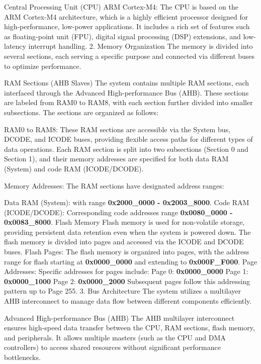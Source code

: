 \documentclass{Configuration_Files/PoliMi3i_thesis}
\begin{document}
Central Processing Unit (CPU) ARM Cortex-M4: The CPU is based on the ARM Cortex-M4 architecture, which is a highly efficient processor designed for high-performance, low-power applications. It includes a rich set of features such as floating-point unit (FPU), digital signal processing (DSP) extensions, and low-latency interrupt handling.
2. Memory Organization
The memory is divided into several sections, each serving a specific purpose and connected via different buses to optimize performance.

RAM Sections (AHB Slaves)
The system contains multiple RAM sections, each interfaced through the Advanced High-performance Bus (AHB). These sections are labeled from RAM0 to RAM8, with each section further divided into smaller subsections. The sections are organized as follows:

RAM0 to RAM8: These RAM sections are accessible via the System bus, DCODE, and ICODE buses, providing flexible access paths for different types of data operations. Each RAM section is split into two subsections (Section 0 and Section 1), and their memory addresses are specified for both data RAM (System) and code RAM (ICODE/DCODE).

Memory Addresses: The RAM sections have designated address ranges:

Data RAM (System): with range \textbf{0x2000\_0000 - 0x2003\_8000}.
Code RAM (ICODE/DCODE): Corresponding code addresses range \textbf{0x0080\_0000 - 0x0083\_8000}.
Flash Memory
Flash memory is used for non-volatile storage, providing persistent data retention even when the system is powered down. The flash memory is divided into pages and accessed via the ICODE and DCODE buses.
Flash Pages: The flash memory is organized into pages, with the address range for flash starting at \textbf{0x0000\_0000} and extending to \textbf{0x000F\_F000}.
Page Addresses: Specific addresses for pages include:
Page 0: \textbf{0x0000\_0000}
Page 1: \textbf{0x0000\_1000}
Page 2: \textbf{0x0000\_2000}
Subsequent pages follow this addressing pattern up to Page 255.
3. Bus Architecture
The system utilizes a multilayer AHB interconnect to manage data flow between different components efficiently.

Advanced High-performance Bus (AHB)
The AHB multilayer interconnect ensures high-speed data transfer between the CPU, RAM sections, flash memory, and peripherals. It allows multiple masters (such as the CPU and DMA controllers) to access shared resources without significant performance bottlenecks.
\end{document}
